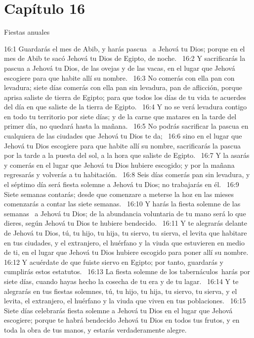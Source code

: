 \section*{Capítulo 16}
Fiestas anuales   

16:1 Guardarás el mes de Abib, y harás pascua  a Jehová tu Dios; porque en el mes de Abib te sacó Jehová tu Dios de Egipto, de noche.  
16:2 Y sacrificarás la pascua a Jehová tu Dios, de las ovejas y de las vacas, en el lugar que Jehová escogiere para que habite allí su nombre.  
16:3 No comerás con ella pan con levadura; siete días comerás con ella pan sin levadura, pan de aflicción, porque aprisa saliste de tierra de Egipto; para que todos los días de tu vida te acuerdes del día en que saliste de la tierra de Egipto.  
16:4 Y no se verá levadura contigo en todo tu territorio por siete días; y de la carne que matares en la tarde del primer día, no quedará hasta la mañana.  
16:5 No podrás sacrificar la pascua en cualquiera de las ciudades que Jehová tu Dios te da;  
16:6 sino en el lugar que Jehová tu Dios escogiere para que habite allí su nombre, sacrificarás la pascua por la tarde a la puesta del sol, a la hora que saliste de Egipto.  
16:7 Y la asarás y comerás en el lugar que Jehová tu Dios hubiere escogido; y por la mañana regresarás y volverás a tu habitación.  
16:8 Seis días comerás pan sin levadura, y el séptimo día será fiesta solemne a Jehová tu Dios; no trabajarás en él.  
16:9 Siete semanas contarás; desde que comenzare a meterse la hoz en las mieses comenzarás a contar las siete semanas.  
16:10 Y harás la fiesta solemne de las semanas  a Jehová tu Dios; de la abundancia voluntaria de tu mano será lo que dieres, según Jehová tu Dios te hubiere bendecido.  
16:11 Y te alegrarás delante de Jehová tu Dios, tú, tu hijo, tu hija, tu siervo, tu sierva, el levita que habitare en tus ciudades, y el extranjero, el huérfano y la viuda que estuvieren en medio de ti, en el lugar que Jehová tu Dios hubiere escogido para poner allí su nombre.  
16:12 Y acuérdate de que fuiste siervo en Egipto; por tanto, guardarás y cumplirás estos estatutos.  
16:13 La fiesta solemne de los tabernáculos harás por siete días, cuando hayas hecho la cosecha de tu era y de tu lagar.  
16:14 Y te alegrarás en tus fiestas solemnes, tú, tu hijo, tu hija, tu siervo, tu sierva, y el levita, el extranjero, el huérfano y la viuda que viven en tus poblaciones.  
16:15 Siete días celebrarás fiesta solemne a Jehová tu Dios en el lugar que Jehová escogiere; porque te habrá bendecido Jehová tu Dios en todos tus frutos, y en toda la obra de tus manos, y estarás verdaderamente alegre. 

